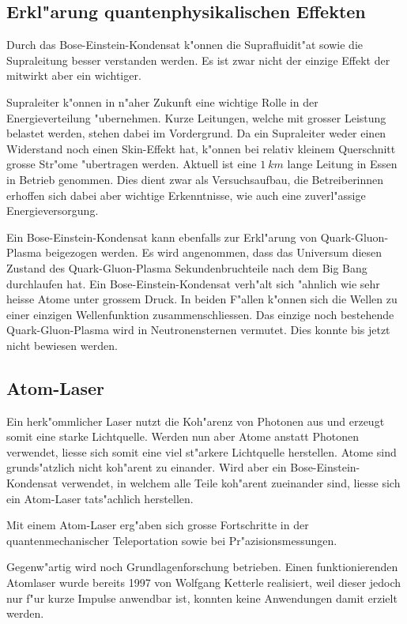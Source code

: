 \begin{refsection}
\subsection{Erkl"arung quantenphysikalischen Effekten}
Durch das Bose-Einstein-Kondensat k"onnen die Suprafluidit"at sowie die Supraleitung besser verstanden werden. Es ist zwar nicht der einzige Effekt der mitwirkt aber ein wichtiger. 

Supraleiter k"onnen in n"aher Zukunft eine wichtige Rolle in der Energieverteilung "ubernehmen. Kurze Leitungen, welche mit grosser Leistung belastet werden, stehen dabei im Vordergrund. Da ein Supraleiter weder einen Widerstand noch einen Skin-Effekt hat, k"onnen bei relativ kleinem Querschnitt grosse Str"ome "ubertragen werden. 
Aktuell ist eine $1~km$ lange Leitung in Essen in Betrieb genommen. Dies dient zwar als Versuchsaufbau, die Betreiberinnen erhoffen sich dabei aber wichtige Erkenntnisse, wie auch eine zuverl"assige Energieversorgung. \cite{bose:SupraVerteilnetze}

Ein Bose-Einstein-Kondensat kann ebenfalls zur Erkl"arung von Quark-Gluon-Plasma beigezogen werden. Es wird angenommen, dass das Universum diesen Zustand des Quark-Gluon-Plasma Sekundenbruchteile nach dem Big Bang durchlaufen hat. Ein Bose-Einstein-Kondensat verh"alt sich "ahnlich wie sehr heisse Atome unter grossem Druck. In beiden F"allen k"onnen sich die Wellen zu einer einzigen Wellenfunktion zusammenschliessen. Das einzige noch bestehende Quark-Gluon-Plasma wird in Neutronensternen vermutet. Dies konnte bis jetzt nicht bewiesen werden. \cite{bose:MITvideo}

\subsection{Atom-Laser}
Ein herk"ommlicher Laser nutzt die Koh"arenz von Photonen aus und erzeugt somit eine starke Lichtquelle. Werden nun aber Atome anstatt Photonen verwendet, liesse sich somit eine viel st"arkere Lichtquelle herstellen. Atome sind grunds"atzlich nicht koh"arent zu einander. Wird aber ein Bose-Einstein-Kondensat verwendet, in welchem alle Teile koh"arent zueinander sind, liesse sich ein Atom-Laser tats"achlich herstellen.

Mit einem Atom-Laser erg"aben sich grosse Fortschritte in der quantenmechanischer Teleportation sowie bei Pr"azisionsmessungen.

Gegenw"artig wird noch Grundlagenforschung betrieben. Einen funktionierenden Atomlaser wurde bereits 1997 von Wolfgang Ketterle realisiert, weil dieser jedoch nur f"ur kurze Impulse anwendbar ist, konnten keine Anwendungen damit erzielt werden. 


\end{refsection}
